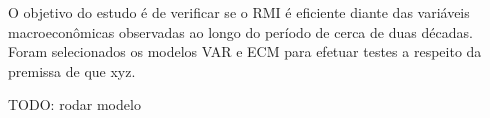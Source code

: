 \documentclass[12pt,oneside,a4paper,chapter=TITLE,english,brazil,sumario=abnt-6027-2012]{abntex2}
\begin{document}
O objetivo do estudo é de verificar se o RMI é eficiente diante das variáveis macroeconômicas observadas ao longo do período de cerca de duas décadas. Foram selecionados os modelos VAR e ECM para efetuar testes a respeito da premissa de que xyz.

TODO: rodar modelo








\end{document}
